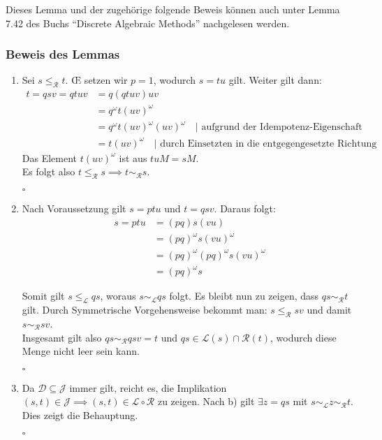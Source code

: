 \documentclass[12pt, german]{article}
\newcommand{\pom}{^{\omega}}
\newcommand{\grel}{\sim_{\mathcal{L}}}
\newcommand{\grer}{\sim_{\mathcal{R}}}
\newcommand{\lgreleq}{\leqslant_{\mathcal{L}}}
\newcommand{\lgrereq}{\leqslant_{\mathcal{R}}}
\newcommand{\bewiesen}{
	
	\begin{flushright}
		$\square$  \\
\end{flushright}}
\begin{document}
	Dieses Lemma und der zugehörige folgende Beweis können auch unter Lemma 7.42 des Buchs ``Discrete Algebraic Methods'' nachgelesen werden.
	
	\subsubsection{Beweis des Lemmas}
	\label{sec:dgleichj}
	\begin{enumerate}[label = \alph*)]
		\item Sei $s \lgrereq t$. \OE\hspace{1pt} setzen wir $p=1$, wodurch $s = tu$ gilt. Weiter gilt dann: 
		\begin{align*}
			t=qsv = qtuv&= q(qtuv)uv \\
			&= q\pom t(uv)\pom \\
			&= q\pom t(uv)\pom(uv)\pom \quad |\text{ aufgrund der Idempotenz-Eigenschaft}\\
			&= t(uv)\pom  \quad |\text{ durch Einsetzten in die entgegengesetzte Richtung}
		\end{align*}
	 	Das Element $t(uv)\pom$ ist aus $tuM = sM$.\\
		Es folgt also $t \lgrereq s \implies t \grer s$.
		\bewiesen
		
		\item Nach Voraussetzung gilt $s=ptu$ und $t=qsv$. Daraus folgt: 
		\begin{align*}
			s=ptu &= (pq)s(vu) \\
			&=(pq)\pom s(vu)\pom \\
			&= (pq)\pom(pq)\pom s (vu)\pom \\
			&= (pq)\pom s
		\end{align*}
		
		Somit gilt $s \lgreleq qs$, woraus $s \grel qs$ folgt. Es bleibt nun zu zeigen, dass $qs \grer t$ gilt. 
		Durch Symmetrische Vorgehensweise bekommt man: $s \lgrereq sv$ und damit
		$s \grer sv$. \\ 
		Insgesamt gilt also $qs \grer qsv = t$ und $qs \in \mathcal{L}(s) \cap \mathcal{R}(t)$, wodurch diese Menge nicht leer sein kann.
		\bewiesen
		
		\item Da $\mathcal{D} \subseteq \mathcal{J}$ immer gilt, reicht es, die Implikation $(s,t) \in \mathcal{J} \implies (s,t) \in \mathcal{L} \circ \mathcal{R}$ zu zeigen. 
		Nach b) gilt $\exists z = qs$ mit $s \grel z \grer t$. Dies zeigt die Behauptung.
		\bewiesen
	\end{enumerate}
	
\end{document}

